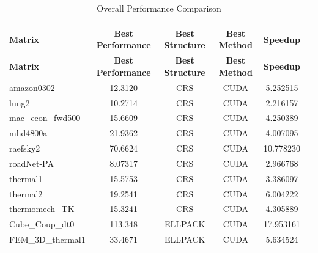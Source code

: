 \documentclass[12pt,oneside]{book} %
\begin{document}
\begin{longtable}{lccccr}
    \caption{Overall Performance Comparison}                                                                          \\
    \label{tab:overallperformance}                                                                                    \\
    \toprule
    \textbf{Matrix}   & \textbf{Best Performance} & \textbf{Best Structure} & \textbf{Best Method} & \textbf{Speedup} \\
    \midrule
    \endfirsthead
    \toprule
    \textbf{Matrix}   & \textbf{Best Performance} & \textbf{Best Structure} & \textbf{Best Method} & \textbf{Speedup} \\
    \midrule
    \endhead
    \bottomrule
    \endfoot
    amazon0302        & 12.3120                   & CRS                     & CUDA                 & 5.252515         \\
    lung2             & 10.2714                   & CRS                     & CUDA                 & 2.216157         \\
    mac\_econ\_fwd500 & 15.6609                   & CRS                     & CUDA                 & 4.250389         \\
    mhd4800a          & 21.9362                   & CRS                     & CUDA                 & 4.007095         \\
    raefsky2          & 70.6624                   & CRS                     & CUDA                 & 10.778230        \\
    roadNet-PA        & 8.07317                   & CRS                     & CUDA                 & 2.966768         \\
    thermal1          & 15.5753                   & CRS                     & CUDA                 & 3.386097         \\
    thermal2          & 19.2541                   & CRS                     & CUDA                 & 6.004222         \\
    thermomech\_TK    & 15.3241                   & CRS                     & CUDA                 & 4.305889         \\
    Cube\_Coup\_dt0   & 113.348                   & ELLPACK                 & CUDA                 & 17.953161        \\
    FEM\_3D\_thermal1 & 33.4671                   & ELLPACK                 & CUDA                 & 5.634524         \\

\end{longtable}
\end{document}
